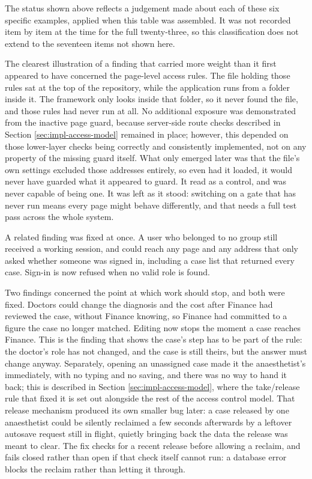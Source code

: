 The status shown above reflects a judgement made about each of these six specific examples, applied when this table was assembled. It was not recorded item by item at the time for the full twenty-three, so this classification does not extend to the seventeen items not shown here.

The clearest illustration of a finding that carried more weight than it first appeared to have concerned the page-level access rules. The file holding those rules sat at the top of the repository, while the application runs from a folder inside it. The framework only looks inside that folder, so it never found the file, and those rules had never run at all. No additional exposure was demonstrated from the inactive page guard, because server-side route checks described in Section \ref{sec:impl-access-model} remained in place; however, this depended on those lower-layer checks being correctly and consistently implemented, not on any property of the missing guard itself. What only emerged later was that the file's own settings excluded those addresses entirely, so even had it loaded, it would never have guarded what it appeared to guard. It read as a control, and was never capable of being one. It was left as it stood: switching on a gate that has never run means every page might behave differently, and that needs a full test pass across the whole system.

A related finding was fixed at once. A user who belonged to no group still received a working session, and could reach any page and any address that only asked whether someone was signed in, including a case list that returned every case. Sign-in is now refused when no valid role is found.

Two findings concerned the point at which work should stop, and both were fixed. Doctors could change the diagnosis and the cost after Finance had reviewed the case, without Finance knowing, so Finance had committed to a figure the case no longer matched. Editing now stops the moment a case reaches Finance. This is the finding that shows the case's step has to be part of the rule: the doctor's role has not changed, and the case is still theirs, but the answer must change anyway. Separately, opening an unassigned case made it the anaesthetist's immediately, with no typing and no saving, and there was no way to hand it back; this is described in Section \ref{sec:impl-access-model}, where the take/release rule that fixed it is set out alongside the rest of the access control model. That release mechanism produced its own smaller bug later: a case released by one anaesthetist could be silently reclaimed a few seconds afterwards by a leftover autosave request still in flight, quietly bringing back the data the release was meant to clear. The fix checks for a recent release before allowing a reclaim, and fails closed rather than open if that check itself cannot run: a database error blocks the reclaim rather than letting it through.

